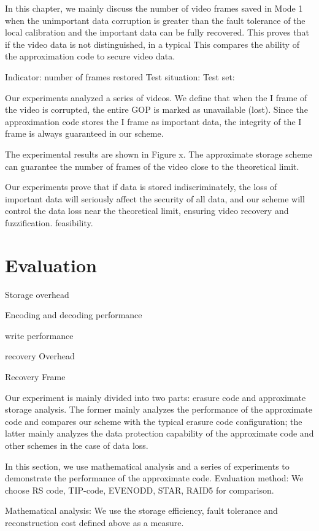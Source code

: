 \documentclass[sigconf]{acmart}
\begin{document}
In this chapter, we mainly discuss the number of video frames saved in Mode 1 when the unimportant data corruption is greater than the fault tolerance of the local calibration and the important data can be fully recovered.
This proves that if the video data is not distinguished, in a typical
This compares the ability of the approximation code to secure video data.

Indicator: number of frames restored
Test situation:
Test set:

Our experiments analyzed a series of videos. We define that when the I frame of the video is corrupted, the entire GOP is marked as unavailable (lost).
Since the approximation code stores the I frame as important data, the integrity of the I frame is always guaranteed in our scheme.

The experimental results are shown in Figure x. The approximate storage scheme can guarantee the number of frames of the video close to the theoretical limit.


Our experiments prove that if data is stored indiscriminately, the loss of important data will seriously affect the security of all data, and our scheme will control the data loss near the theoretical limit, ensuring video recovery and fuzzification. feasibility.

\section{Evaluation}\label{evaluation}

Storage overhead

Encoding and decoding performance

write performance

recovery Overhead

Recovery Frame


Our experiment is mainly divided into two parts: erasure code and approximate storage analysis. The former mainly analyzes the performance of the approximate code and compares our scheme with the typical erasure code configuration; the latter mainly analyzes the data protection capability of the approximate code and other schemes in the case of data loss.



In this section, we use mathematical analysis and a series of experiments to demonstrate the performance of the approximate code.
Evaluation method: We choose RS code, TIP-code, EVENODD, STAR, RAID5 for comparison.

Mathematical analysis: We use the storage efficiency, fault tolerance and reconstruction cost defined above as a measure.
\end{document}

